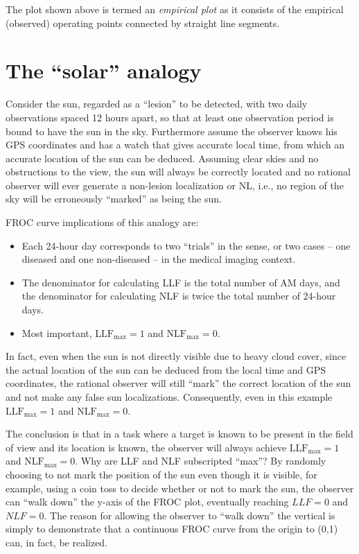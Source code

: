 \documentclass[
]{book}
\providecommand{\tightlist}{%
  \setlength{\itemsep}{0pt}\setlength{\parskip}{0pt}}
\begin{document}
The plot shown above is termed an \emph{empirical plot} as it consists of the empirical (observed) operating points connected by straight line segments.

\hypertarget{froc-paradigm-solar-analogy}{%
\section{The ``solar'' analogy}\label{froc-paradigm-solar-analogy}}

Consider the sun, regarded as a ``lesion'' to be detected, with two daily observations spaced 12 hours apart, so that at least one observation period is bound to have the sun in the sky. Furthermore assume the observer knows his GPS coordinates and has a watch that gives accurate local time, from which an accurate location of the sun can be deduced. Assuming clear skies and no obstructions to the view, the sun will always be correctly located and no rational observer will ever generate a non-lesion localization or NL, i.e., no region of the sky will be erroneously ``marked'' as being the sun.

FROC curve implications of this analogy are:

\begin{itemize}
\tightlist
\item
  Each 24-hour day corresponds to two ``trials'' in the \citep{RN897} sense, or two cases -- one diseased and one non-diseased -- in the medical imaging context.
\item
  The denominator for calculating LLF is the total number of AM days, and the denominator for calculating NLF is twice the total number of 24-hour days.
\item
  Most important, \(\text{LLF}_{\text{max}} = 1\) and \(\text{NLF}_{\text{max}} = 0\).
\end{itemize}

In fact, even when the sun is not directly visible due to heavy cloud cover, since the actual location of the sun can be deduced from the local time and GPS coordinates, the rational observer will still ``mark'' the correct location of the sun and not make any false sun localizations. Consequently, even in this example \(\text{LLF}_{\text{max}} = 1\) and \(\text{NLF}_{\text{max}} = 0\).

The conclusion is that in a task where a target is known to be present in the field of view and its location is known, the observer will always achieve \(\text{LLF}_{\text{max}} = 1\) and \(\text{NLF}_{\text{max}} = 0\). Why are LLF and NLF subscripted ``max''? By randomly choosing to not mark the position of the sun even though it is visible, for example, using a coin toss to decide whether or not to mark the sun, the observer can ``walk down'' the y-axis of the FROC plot, eventually reaching \(LLF = 0\) and \(NLF = 0\). The reason for allowing the observer to ``walk down'' the vertical is simply to demonstrate that a continuous FROC curve from the origin to (0,1) can, in fact, be realized.
\end{document}
